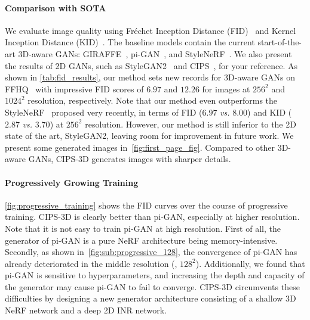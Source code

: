 \documentclass[10pt,twocolumn,letterpaper]{article}
\begin{document}
\paragraph{Comparison with SOTA}
We evaluate image quality using Fréchet Inception Distance (FID)~\cite{heusel2017GANs} and Kernel Inception Distance (KID)~\cite{binkowski2021Demystifying}. The baseline models contain the current start-of-the-art 3D-aware GANs: GIRAFFE~\cite{niemeyer2021GIRAFFE}, pi-GAN~\cite{chan2021piGAN}, and StyleNeRF~\cite{anonymous2021StyleNeRF}. We also present the results of 2D GANs, such as StyleGAN2~\cite{karras2019Analyzing} and CIPS~\cite{anokhin2021Image}, for your reference. As shown in \cref{tab:fid_results}, our method sets new records for 3D-aware GANs on FFHQ~\cite{karras2019StyleBased} with impressive FID scores of $6.97$ and $12.26$ for images at $256^2$ and $1024^2$ resolution, respectively. Note that our method even outperforms the StyleNeRF~\cite{anonymous2021StyleNeRF} proposed very recently, in terms of FID ($6.97$ \textit{vs.} $8.00$) and KID ($2.87$ \textit{vs.} $3.70$) at $256^2$ resolution. However, our method is still inferior to the 2D state of the art, StyleGAN2, leaving room for improvement in future work.
We present some generated images in~\cref{fig:first_page_fig}. Compared to other 3D-aware GANs, CIPS-3D generates images with sharper details.


\paragraph{Progressively Growing Training}
\cref{fig:progressive_training} shows the FID curves over the course of progressive training. CIPS-3D is clearly better than pi-GAN, especially at higher resolution. Note that it is not easy to train pi-GAN at high resolution. First of all, the generator of pi-GAN is a pure NeRF architecture being memory-intensive. Secondly, as shown in~\cref{fig:sub:progressive_128}, the convergence of pi-GAN has already deteriorated in the middle resolution (\ie, $128^2$). Additionally, we found that pi-GAN is sensitive to hyperparameters, and increasing the depth and capacity of the generator may cause pi-GAN to fail to converge. CIPS-3D circumvents these difficulties by designing a new generator architecture consisting of a shallow 3D NeRF network and a deep 2D INR network.
\end{document}
